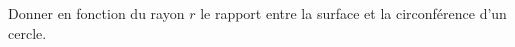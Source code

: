 
\begin{exercice}\label{exoSeconde-0061}

    Donner en fonction du rayon \( r\) le rapport entre la surface et la circonférence d'un cercle.

\end{exercice}
